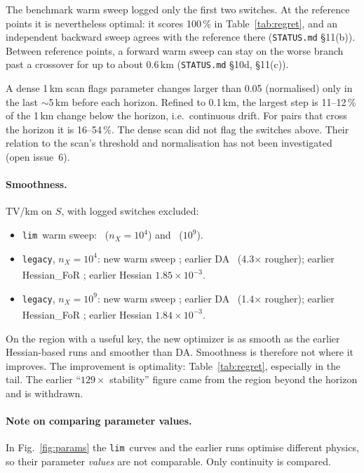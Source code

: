 \documentclass[11pt,a4paper]{article}
\newcommand{\typed}{\textsuperscript{\dag}}
\newcommand{\plim}{\texttt{lim}}
\newcommand{\legacy}{\texttt{legacy}}
\begin{document}
The benchmark warm sweep logged only the first two switches. At the reference points it is nevertheless optimal: it
scores 100\,\% in Table~\ref{tab:regret}, and an independent backward sweep agrees with the reference there
(\texttt{STATUS.md} \S11(b)). Between reference points, a forward warm sweep can stay on the worse branch past a
crossover for up to about 0.6\,km (\texttt{STATUS.md} \S10d, \S11(c)).

A dense 1\,km scan flags parameter changes larger than 0.05 (normalised) only in the last $\sim$5\,km before
each horizon. Refined to 0.1\,km, the largest step is 11--12\,\% of the 1\,km change below the horizon,
i.e.\ continuous drift. For pairs that cross the horizon it is 16--54\,\%. The dense scan did not flag the
switches above. Their relation to the scan's threshold and normalisation has not been investigated (open
issue~6).

\paragraph{Smoothness.} TV/km on $S$, with logged switches excluded:
\begin{itemize}
\item \plim\ warm sweep: \QKDLimNewWarmTVFour\ ($n_X=10^4$) and \QKDLimNewWarmTVNine\ ($10^9$).
\item \legacy, $n_X=10^4$: new warm sweep \QKDLegacyNewWarmTVFour; earlier DA \QKDLegacyOldDATVFour\ (4.3$\times$
  rougher); earlier Hessian\_FoR \QKDLegacyOldFoRTVFour; earlier Hessian $1.85\times10^{-3}$\typed.
\item \legacy, $n_X=10^9$: new warm sweep \QKDLegacyNewWarmTVNine; earlier DA \QKDLegacyOldDATVNine\
  (1.4$\times$ rougher); earlier Hessian\_FoR \QKDLegacyOldFoRTVNine; earlier Hessian $1.84\times10^{-3}$\typed.
\end{itemize}
On the region with a useful key, the new optimizer is as smooth as the earlier Hessian-based runs and smoother
than DA. Smoothness is therefore not where it improves. The improvement is optimality: Table~\ref{tab:regret},
especially in the tail. The earlier ``$129\times$ stability'' figure came from the region beyond the horizon and is
withdrawn.

\paragraph{Note on comparing parameter values.} In Fig.~\ref{fig:params} the \plim\ curves and the earlier runs
optimise different physics, so their parameter \emph{values} are not comparable. Only continuity is compared.
\end{document}
